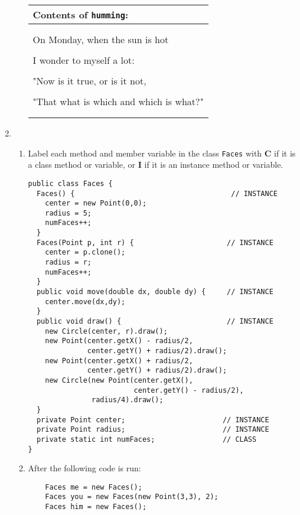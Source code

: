 \begin{enumerate}
\begin{enumerate}
        	\begin{tabular}{|l|}
            	\hline
        	{\bf Contents of {\tt humming}:}\\
            	\hline
            	\\
\\            	
On Monday, when the sun is hot \\
\\
I wonder to myself a lot: \\
\\
"Now is it true, or is it not, \\
\\
"That what is which and which is what?" \\
\\
\\
            	\hline
        	\end{tabular}

	\end{enumerate}


        \item 
            \begin{enumerate}
            	\item Label each method and member 
 		variable in the class 
		{\tt Faces} with {\bf C} if it
            	is a class method or variable, or {\bf I} if it is an 
                instance method or variable.
\begin{verbatim}
public class Faces {
  Faces() {                                     // INSTANCE
    center = new Point(0,0); 
    radius = 5;
    numFaces++;
  }
  Faces(Point p, int r) {                      // INSTANCE
    center = p.clone(); 
    radius = r;
    numFaces++;
  }
  public void move(double dx, double dy) {     // INSTANCE
    center.move(dx,dy);
  }
  public void draw() {                         // INSTANCE
    new Circle(center, r).draw();
    new Point(center.getX() - radius/2, 
              center.getY() + radius/2).draw();
    new Point(center.getX() + radius/2, 
              center.getY() + radius/2).draw();
    new Circle(new Point(center.getX(), 
                         center.getY() - radius/2), 
               radius/4).draw();
  }
  private Point center;                       // INSTANCE
  private Point radius;                       // INSTANCE
  private static int numFaces;                // CLASS
}
\end{verbatim}

		\item After the following code is run:
\begin{verbatim}
    Faces me = new Faces();
    Faces you = new Faces(new Point(3,3), 2);
    Faces him = new Faces();
\end{verbatim}
		

\end{enumerate}
\end{enumerate}

